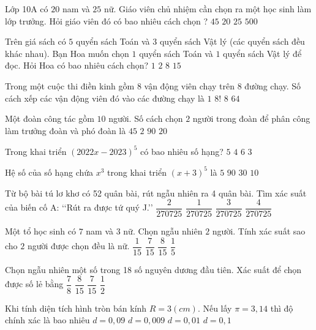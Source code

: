 \begin{ex}
	Lớp 10A có $20$ nam và $25$ nữ. Giáo viên chủ nhiệm cần chọn ra một học sinh làm lớp trưởng. Hỏi giáo viên đó có bao nhiêu cách chọn ?
	\choice
	{$45$}
	{$20$}
	{$25$}
	{$500$}
\end{ex}
\begin{ex}
	Trên giá sách có $5$ quyển sách Toán và $3$ quyển sách Vật lý (các quyển sách đều khác nhau). Bạn Hoa muốn chọn $1$ quyển sách Toán và $1$ quyển sách Vật lý để đọc. Hỏi Hoa có bao nhiêu cách chọn?
	\choice
	{$1$}
	{$2$}
	{$8$}
	{$15$}
\end{ex}
\begin{ex}
	Trong một cuộc thi điền kinh gồm $8$ vận động viên chạy trên $8$ đường chạy. Số cách xếp các vận động viên đó vào các đường chạy là 
	\choice
	{$1$}
	{$8!$}
	{$8$}
	{$64$}
\end{ex}
\begin{ex}
	Một đoàn công tác gồm $10$ người. Số cách chọn $2$ người trong đoàn để phân công làm trưởng đoàn và phó đoàn là 
	\choice
	{$45$}
	{$2$}
	{$90$}
	{$20$}
\end{ex}
\begin{ex}
	Trong khai triển $(2022x-2023)^5$ có bao nhiêu số hạng?
	\choice
	{$5$}
	{$4$}
	{$6$}
	{$3$}
\end{ex}
\begin{ex}
Hệ số của số hạng chứa $x^3$ trong khai triển ${{(x+3)}^5}$ là
\choice
{$5$}
{$90$}
{$30$}
{$10$}
\end{ex}
\begin{ex}
Từ bộ bài tú lơ khơ có 52 quân bài, rút ngẫu nhiên ra 4 quân bài. Tìm xác suất của biến cố A: 
\lq\lq  Rút ra được tứ quý J.\rq\rq
\choice
{$\dfrac{2}{270725}$}
{$\dfrac{1}{270725}$}
{$\dfrac{3}{270725}$}
{$\dfrac{4}{270725}$}
\end{ex}
\begin{ex}
Một tổ học sinh có $7$ nam và $3$ nữ. Chọn ngẫu nhiên $2$ người. Tính xác suất sao cho $2$ người được chọn đều là nữ.
\choice
{$\dfrac{1}{15}$}
{$\dfrac{7}{15}$}
{$\dfrac{8}{15}$}
{$\dfrac{1}{5}$}
\end{ex}
\begin{ex}
Chọn ngẫu nhiên một số trong 18 số nguyên dương đầu tiên. Xác suất để chọn được số lẻ
bằng
\choice
{$\dfrac{7}{8}$}
{$\dfrac{8}{15}$}
{$\dfrac{7}{15}$}
{$\dfrac{1}{2}$}
\end{ex}
\begin{ex}
Khi tính diện tích hình tròn bán kính $R=3(cm)$. Nếu lấy $\pi =3{,}14$ thì độ chính xác là bao nhiêu
\choice
{$d=0{,}09$}
{$d=0{,}009$}
{$d=0{,}01$}
{$d=0{,}1$}
\end{ex}
